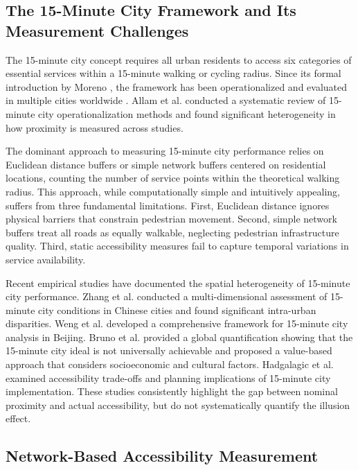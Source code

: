 \documentclass[10pt,conference,compsoc]{IEEEtran}
\begin{document}
\subsection{The 15-Minute City Framework and Its Measurement Challenges}

The 15-minute city concept requires all urban residents to access six categories of essential services within a 15-minute walking or cycling radius. Since its formal introduction by Moreno \cite{moreno202115minute}, the framework has been operationalized and evaluated in multiple cities worldwide \cite{allam2022operationalising}. Allam et al. \cite{allam2022operationalising} conducted a systematic review of 15-minute city operationalization methods and found significant heterogeneity in how proximity is measured across studies.

The dominant approach to measuring 15-minute city performance relies on Euclidean distance buffers or simple network buffers centered on residential locations, counting the number of service points within the theoretical walking radius. This approach, while computationally simple and intuitively appealing, suffers from three fundamental limitations. First, Euclidean distance ignores physical barriers that constrain pedestrian movement. Second, simple network buffers treat all roads as equally walkable, neglecting pedestrian infrastructure quality. Third, static accessibility measures fail to capture temporal variations in service availability.

Recent empirical studies have documented the spatial heterogeneity of 15-minute city performance. Zhang et al. \cite{zhang2023multi} conducted a multi-dimensional assessment of 15-minute city conditions in Chinese cities and found significant intra-urban disparities. Weng et al. \cite{weng2021accessibility} developed a comprehensive framework for 15-minute city analysis in Beijing. Bruno et al. \cite{bruno2024universal} provided a global quantification showing that the 15-minute city ideal is not universally achievable and proposed a value-based approach that considers socioeconomic and cultural factors. Hadgalagic et al. \cite{hadgalagic2023examining} examined accessibility trade-offs and planning implications of 15-minute city implementation. These studies consistently highlight the gap between nominal proximity and actual accessibility, but do not systematically quantify the illusion effect.

\subsection{Network-Based Accessibility Measurement}
\end{document}
